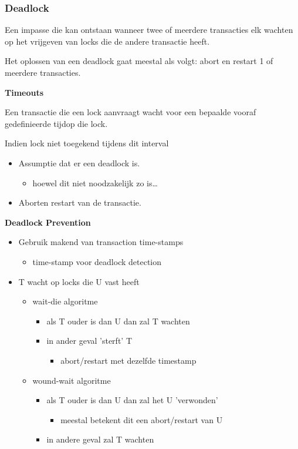 \documentclass[a4paper,12pt]{article}
\begin{document}
\subsubsection{Deadlock}
Een impasse die kan ontstaan wanneer twee of meerdere transacties elk wachten op het vrijgeven van locks die de andere transactie heeft.

Het oplossen van een deadlock gaat meestal als volgt:
abort en restart 1 of meerdere transacties.

\textbf{Timeouts}

Een transactie die een lock aanvraagt wacht voor een bepaalde vooraf gedefinieerde tijdop die lock.

Indien lock niet toegekend tijdens dit interval
\begin{itemize}
\item Assumptie dat er een deadlock is.
	\begin{itemize}
	\item hoewel dit niet noodzakelijk zo is\dots
	\end{itemize}
\item Aborten restart van de transactie.
\end{itemize}

\textbf{Deadlock Prevention}

\begin{itemize}
\item Gebruik makend van transaction time-stamps
	\begin{itemize}
	\item time-stamp voor deadlock detection
	\end{itemize} 
\item T wacht op locks die U vast heeft
	\begin{itemize}
	\item wait-die algoritme
		\begin{itemize}
		\item als T ouder is dan U dan zal T wachten
		\item in ander geval 'sterft' T
			\begin{itemize}
			\item abort/restart met dezelfde timestamp
			\end{itemize}
		\end{itemize}
	\item wound-wait algoritme
		\begin{itemize}
		\item als T ouder is dan U dan zal het U 'verwonden'
			\begin{itemize}
			\item meestal betekent dit een abort/restart van U
			\end{itemize}
		\item in andere geval zal T wachten
		\end{itemize}
	\end{itemize}
\end{itemize}
\end{document}

